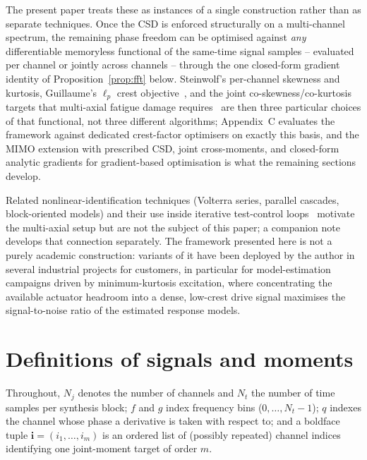 \documentclass[10pt,a4paper]{article}
\numberwithin{equation}{section}
\newcommand{\mat}[1]{\left(#1\right)}
\begin{document}
The present paper treats these as instances of a single construction rather than as separate techniques. Once the CSD is enforced structurally on a multi-channel spectrum, the remaining phase freedom can be optimised against \emph{any} differentiable memoryless functional of the same-time signal samples -- evaluated per channel or jointly across channels -- through the one closed-form gradient identity of Proposition~\ref{prop:fft} below. Steinwolf's per-channel skewness and kurtosis, Guillaume's $\ell_p$ crest objective~\cite{guillaume1991crest}, and the joint co-skewness/co-kurtosis targets that multi-axial fatigue damage requires~\cite{saathoff2006synthetic} are then three particular choices of that functional, not three different algorithms; Appendix~C evaluates the framework against dedicated crest-factor optimisers on exactly this basis, and the MIMO extension with prescribed CSD, joint cross-moments, and closed-form analytic gradients for gradient-based optimisation is what the remaining sections develop.

Related nonlinear-identification techniques (Volterra series, parallel cascades, block-oriented models) and their use inside iterative test-control loops~\cite{bendat1998nonlinear,pintelon_schoukens_ident,schoukens_odd_multisine} motivate the multi-axial setup but are not the subject of this paper; a companion note develops that connection separately. The framework presented here is not a purely academic construction: variants of it have been deployed by the author in several industrial projects for customers, in particular for model-estimation campaigns driven by minimum-kurtosis excitation, where concentrating the available actuator headroom into a dense, low-crest drive signal maximises the signal-to-noise ratio of the estimated response models.

\section*{Definitions of signals and moments}

Throughout, $N_j$ denotes the number of channels and $N_t$ the number of time samples per synthesis block; $f$ and $g$ index frequency bins ($0,\ldots,N_t-1$); $q$ indexes the channel whose phase a derivative is taken with respect to; and a boldface tuple $\mathbf{i} = \mat{i_1,\ldots,i_m}$ is an ordered list of (possibly repeated) channel indices identifying one joint-moment target of order $m$.
\end{document}
